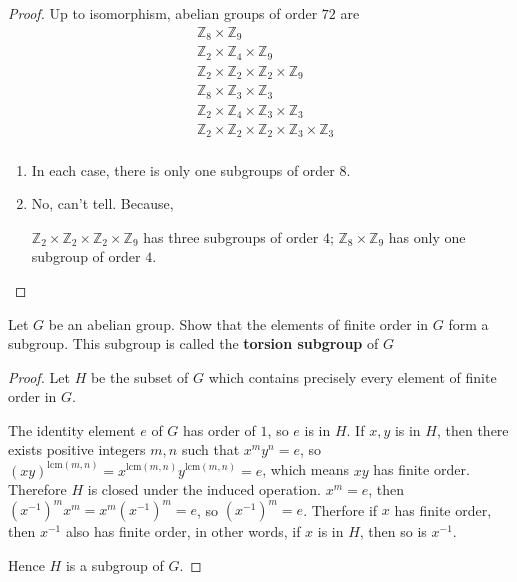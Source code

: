 \begin{proof}
    Up to isomorphism, abelian groups of order $72$ are
    \begin{align*}
         & \mathbb{Z}_{8} \times \mathbb{Z}_{9}                                                                   \\
         & \mathbb{Z}_{2} \times \mathbb{Z}_{4} \times \mathbb{Z}_{9}                                             \\
         & \mathbb{Z}_{2} \times \mathbb{Z}_{2} \times \mathbb{Z}_{2} \times \mathbb{Z}_{9}                       \\
         & \mathbb{Z}_{8} \times \mathbb{Z}_{3} \times \mathbb{Z}_{3}                                             \\
         & \mathbb{Z}_{2} \times \mathbb{Z}_{4} \times \mathbb{Z}_{3} \times \mathbb{Z}_{3}                       \\
         & \mathbb{Z}_{2} \times \mathbb{Z}_{2} \times \mathbb{Z}_{2} \times \mathbb{Z}_{3} \times \mathbb{Z}_{3} \\
    \end{align*}
    \begin{enumerate}[label={\textbf{\alph*.}}]
        \item In each case, there is only one subgroups of order $8$.
        \item No, can't tell. Because,

              $\mathbb{Z}_{2} \times \mathbb{Z}_{2} \times \mathbb{Z}_{2} \times \mathbb{Z}_{9}$ has three subgroups of order $4$; $\mathbb{Z}_{8} \times \mathbb{Z}_{9}$ has only one subgroup of order $4$.
    \end{enumerate}
\end{proof}

\newpage
\begin{exercise}
    Let $G$ be an abelian group. Show that the elements of finite order in $G$ form a subgroup. This subgroup is called the \textbf{torsion subgroup} of $G$
\end{exercise}

\begin{proof}
    Let $H$ be the subset of $G$ which contains precisely every element of finite order in $G$.

    The identity element $e$ of $G$ has order of $1$, so $e$ is in $H$. If $x, y$ is in $H$, then there exists positive integers $m, n$ such that $x^{m}y^{n} = e$, so ${(xy)}^{\text{lcm}(m, n)} = x^{\text{lcm}(m,n)}y^{\text{lcm}(m,n)} = e$, which means $xy$ has finite order. Therefore $H$ is closed under the induced operation. $x^{m} = e$, then ${(x^{-1})}^{m}x^{m} = x^{m}{(x^{-1})}^{m} = e$, so ${(x^{-1})}^{m} = e$. Therfore if $x$ has finite order, then $x^{-1}$ also has finite order, in other words, if $x$ is in $H$, then so is $x^{-1}$.

    Hence $H$ is a subgroup of $G$.
\end{proof}


